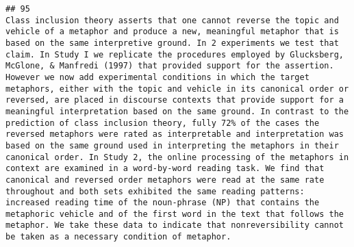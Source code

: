 \documentclass[
  english,
  man]{apa6}
\begin{document}
\begin{verbatim}
## 95                                                                                                                                                                                                                                                                                                                                                                                                                                                                                                                                                                                                                                                                                                                                                                                                                                                                                                                                                                                                                                                                                                                                                                                                                                                                              Class inclusion theory asserts that one cannot reverse the topic and vehicle of a metaphor and produce a new, meaningful metaphor that is based on the same interpretive ground. In 2 experiments we test that claim. In Study I we replicate the procedures employed by Glucksberg, McGlone, & Manfredi (1997) that provided support for the assertion. However we now add experimental conditions in which the target metaphors, either with the topic and vehicle in its canonical order or reversed, are placed in discourse contexts that provide support for a meaningful interpretation based on the same ground. In contrast to the prediction of class inclusion theory, fully 72% of the cases the reversed metaphors were rated as interpretable and interpretation was based on the same ground used in interpreting the metaphors in their canonical order. In Study 2, the online processing of the metaphors in context are examined in a word-by-word reading task. We find that canonical and reversed order metaphors were read at the same rate throughout and both sets exhibited the same reading patterns: increased reading time of the noun-phrase (NP) that contains the metaphoric vehicle and of the first word in the text that follows the metaphor. We take these data to indicate that nonreversibility cannot be taken as a necessary condition of metaphor.

\end{verbatim}
\end{document}

